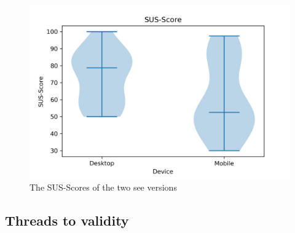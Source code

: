   \begin{figure}[H]
    \centering
    \includegraphics[width=1\textwidth]{Evaluation/img/SUS-Score_violin.png}
    \caption{The SUS-Scores of the two \gls{see} versions}\label{fig:sus-vio}
  \end{figure}

  \subsection{Threads to validity}
  \label{sec:validity}